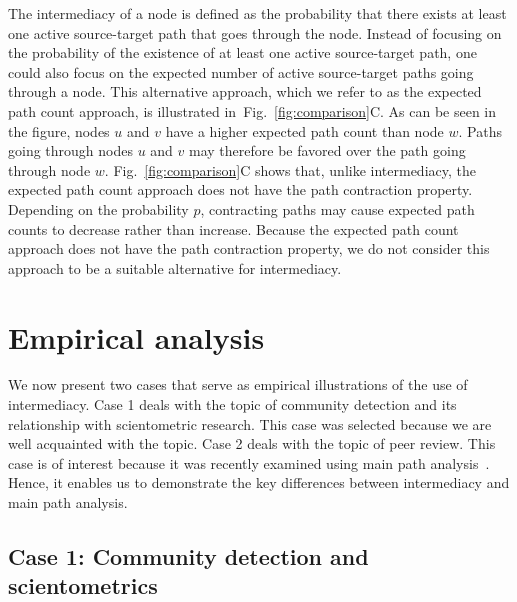 \documentclass[9pt,twocolumn,twoside,lineno]{pnas-alt}
\theoremstyle{definition}
\newcommand{\subfigref}[2]{Fig.~\ref{fig:#1}#2\xspace}
\begin{document}
The intermediacy of a node is defined as the probability that there exists at least one active source-target path that goes through the node. Instead of focusing on the probability of the existence of at least one active source-target path, one could also focus on the expected number of active source-target paths going through a node. This alternative approach, which we refer to as the expected path count approach, is illustrated in~\subfigref{comparison}{C}. As can be seen in the figure, nodes $u$ and $v$ have a higher expected path count than node $w$. Paths going through nodes $u$ and $v$ may therefore be favored over the path going through node $w$. \subfigref{comparison}{C} shows that, unlike intermediacy, the expected path count approach does not have the path contraction property. Depending on the probability $p$, contracting paths may cause expected path counts to decrease rather than increase. Because the expected path count approach does not have the path contraction property, we do not consider this approach to be a suitable alternative for intermediacy.

%
%

\section*{\label{sec:empirical}Empirical analysis}

We now present two cases that serve as empirical illustrations of the use of intermediacy. Case 1 deals with the topic of community detection and its relationship with scientometric research. This case was selected because we are well acquainted with the topic. Case 2 deals with the topic of peer review. This case is of interest because it was recently examined using main path analysis~\cite{Batagelj2017}. Hence, it enables us to demonstrate the key differences between intermediacy and main path analysis.

%
%

\subsection*{\label{sec:Q}Case 1: Community detection and scientometrics}
\end{document}

